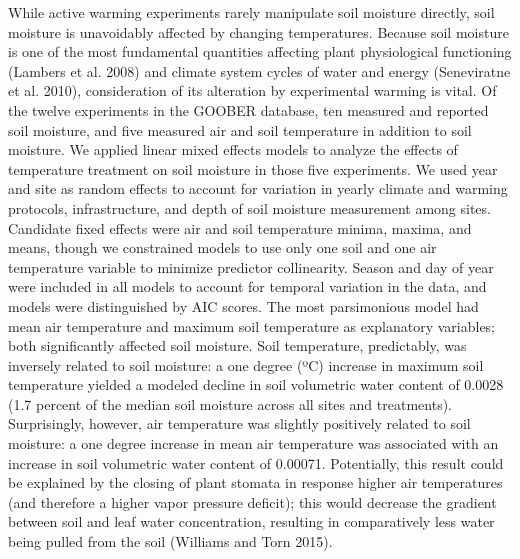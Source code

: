 \documentclass{article}
\begin{document}
\par While active warming experiments rarely manipulate soil moisture directly, soil moisture is unavoidably affected by changing temperatures. Because soil moisture is one of the most fundamental quantities affecting plant physiological functioning (Lambers et al. 2008) and climate system cycles of water and energy (Seneviratne et al. 2010), consideration of its alteration by experimental warming is vital. Of the twelve experiments in the GOOBER database, ten measured and reported soil moisture, and five measured air and soil temperature in addition to soil moisture. We applied linear mixed effects models to analyze the effects of temperature treatment on soil moisture in those five experiments. We used year and site as random effects to account for variation in yearly climate and warming protocols, infrastructure, and depth of soil moisture measurement among sites. Candidate fixed effects were air and soil temperature minima, maxima, and means, though we constrained models to use only one soil and one air temperature variable to minimize predictor collinearity. Season and day of year were included in all models to account for temporal variation in the data, and models were distinguished by AIC scores. 
The most parsimonious model had mean air temperature and maximum soil temperature as explanatory variables; both significantly affected soil moisture. Soil temperature, predictably, was inversely related to soil moisture: a one degree (ºC) increase in maximum soil temperature yielded a modeled decline in soil volumetric water content of 0.0028 (1.7 percent of the median soil moisture across all sites and treatments). Surprisingly, however, air temperature was slightly positively related to soil moisture: a one degree increase in mean air temperature was associated with an increase in soil volumetric water content of 0.00071. Potentially, this result could be explained by the closing of plant stomata in response higher air temperatures (and therefore a higher vapor pressure deficit); this would decrease the gradient between soil and leaf water concentration, resulting in comparatively less water being pulled from the soil (Williams and Torn 2015). 
\end{document}
